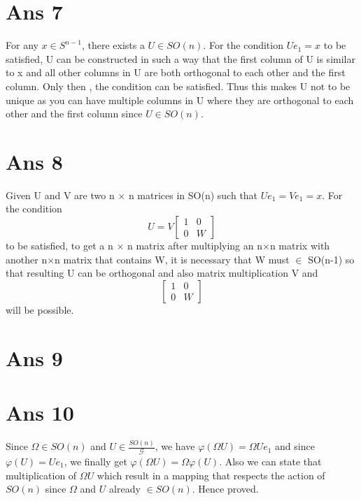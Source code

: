 \documentclass[10pt]{article}
\begin{document}
\section*{Ans 7}
\begin{flushleft}
For any $x \in S^{n-1}$, there exists a $U \in SO(n)$. For the condition $U e_{1} = x$ to be satisfied, U can be constructed in such a way that the first column of U is similar to x and all other columns in U are both orthogonal to each other and the first column. Only then , the condition can be satisfied. Thus this makes U not to be unique as you can have multiple columns in U where they are orthogonal to each other and the first column since $U \in SO(n)$.
\end{flushleft}
\section*{Ans 8}
\begin{flushleft}
Given U and V are two n $\times$ n matrices in SO(n) such that $Ue_{1} = Ve_{1} = x$. For the condition
$$
U = V
\begin{bmatrix}
    1 & 0 \\
    0 & W
\end{bmatrix}
$$
to be satisfied, to get a n $\times$ n matrix after multiplying an n$\times$n matrix with another n$\times$n matrix that contains W, it is necessary that W must $\in$ SO(n-1) so that resulting U can be orthogonal and also matrix multiplication V and 
$$
\begin{bmatrix}
    1 & 0 \\
    0 & W
\end{bmatrix}
$$
will be possible.
\end{flushleft}
\section*{Ans 9}
\begin{flushleft}
\end{flushleft}
\section*{Ans 10}
\begin{flushleft}
Since $\Omega \in SO(n)$ and $U \in \frac{SO(n)}{\mathcal{G}}$, we have $\varphi(\Omega U) = \Omega U e_{1}$ and since $\varphi(U) = U e_{1}$, we finally get $\varphi(\Omega U) = \Omega \varphi(U)$. Also we can state that multiplication of $\Omega U$ which result in a mapping that respects the action of $SO(n)$ since $\Omega$ and $U$ already $\in SO(n)$. Hence proved.
\end{flushleft}
\end{document}

